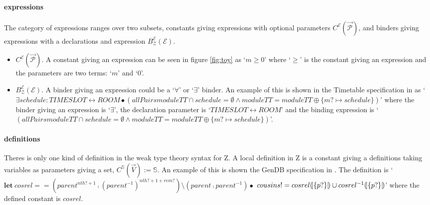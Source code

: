 \paragraph{expressions}
\label{subsubsec:expressions}

The category of expressions ranges over two subsets, constants giving
expressions with optional parameters
$C^{\mathcal{E}}(\overrightarrow{\mathcal{P}})$, and binders giving expressions
with a declarations and expression $B^{\mathcal{E}}_{\mathcal{Z}}(\mathcal{E})$.

\begin{itemize}
\item $C^{\mathcal{E}}(\overrightarrow{\mathcal{P}})$. A constant giving an
expression can be seen in figure \ref{fig:toy} as `$m \geq 0$' where `$\geq$' is
the constant giving an expression and the parameters are two terms: `$m$' and
`$0$'.

\item $B^{\mathcal{E}}_{\mathcal{Z}}(\mathcal{E})$. A binder giving an
expression could be a `$\forall$' or `$\exists$' binder. An example of this is
shown in the Timetable specification in \cite{essenceofz} as
\newline
`$\exists schedule : TIMESLOT \leftrightarrow ROOM \bullet(allPairs moduleTT
\cap schedule = \emptyset \land moduleTT = moduleTT \oplus \{m? \mapsto
schedule\})$'
\newline
where the binder giving an expression is `$\exists$', the declaration parameter
is `$TIMESLOT \leftrightarrow ROOM$' and the binding expression is `$(allPairs
moduleTT \cap schedule = \emptyset \land moduleTT = moduleTT \oplus \{m? \mapsto
schedule\})$'.
\end{itemize}

\paragraph{definitions}
\label{subsubsec:definitions}

Theres is only one kind of definition in the weak type theory syntax for Z. A
local definition in Z is a constant giving a definitions taking variables as
parameters giving a set, $C^{\mathbb{S}}(\overrightarrow{V}):= \mathbb{S}$. An
example of this is shown the GenDB specification in \cite{essenceofz}.
The definition is
\newline
 `$\mathbf{let}\
 cosrel==(parent^{nth?+1}\comp(parent^{-1})^{nth?+1+rem?})\setminus (parent
 \comp parent^{-1}) \bullet$\newline
\indent $cousins! = cosrel (\!| \{p?\}|\!) \cup cosrel^{-1} (\!| \{p?\}
|\!)$'
\newline
where the defined constant is $cosrel$.


